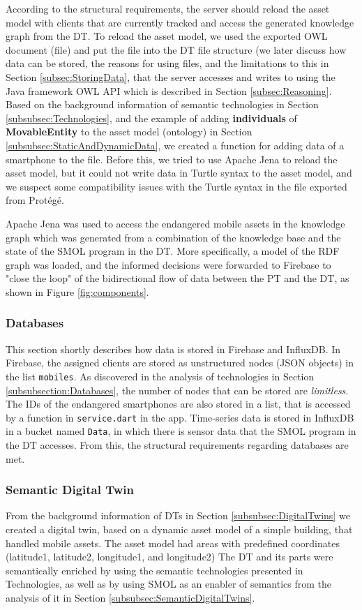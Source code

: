 \documentclass{article}
\begin{document}
According to the structural requirements, the server should reload the asset model with clients that are currently tracked and access the generated knowledge graph from the DT. To reload the asset model, we used the exported OWL document (file) and put the file into the DT file structure (we later discuss how data can be stored, the reasons for using files, and the limitations to this in Section \ref{subsec:StoringData}, that the server accesses and writes to using the Java framework OWL API which is described in Section \ref{subsec:Reasoning}. Based on the background information of semantic technologies in Section \ref{subsubsec:Technologies}, and the example of adding \textbf{individuals} of \textbf{MovableEntity} to the asset model (ontology) in Section \ref{subsubsec:StaticAndDynamicData}, we created a function for adding data of a smartphone to the file. Before this, we tried to use Apache Jena to reload the asset model, but it could not write data in Turtle syntax to the asset model, and we suspect some compatibility issues with the Turtle syntax in the file exported from Protégé.

Apache Jena was used to access the endangered mobile assets in the knowledge graph which was generated from a combination of the knowledge base and the state of the SMOL program in the DT. More specifically, a model of the RDF graph was loaded, and the informed decisions were forwarded to Firebase to "close the loop" of the bidirectional flow of data between the PT and the DT, as shown in Figure \ref{fig:components}.

\subsubsection{Databases}
This section shortly describes how data is stored in Firebase and InfluxDB.
In Firebase, the assigned clients are stored as unstructured nodes (JSON objects) in the list \verb|mobiles|. As discovered in the analysis of technologies in Section \ref{subsubsection:Databases}, the number of nodes that can be stored are \emph{limitless}. The IDs of the endangered smartphones are also stored in a list, that is accessed by a function in \verb|service.dart| in the app. Time-series data is stored in InfluxDB in a bucket named \verb|Data|, in which there is sensor data that the SMOL program in the DT accesses. From this, the structural requirements regarding databases are met.


\subsubsection{Semantic Digital Twin}
From the background information of DTs in Section \ref{subsubsec:DigitalTwins} we created a digital twin, based on a dynamic asset model of a simple building, that handled mobile assets. The asset model had areas with predefined coordinates (latitude1, latitude2, longitude1, and longitude2) The DT and its parts were semantically enriched by using the semantic technologies presented in Technologies, as well as by using SMOL as an enabler of semantics from the analysis of it in Section \ref{subsubsec:SemanticDigitalTwins}. 
\end{document}
